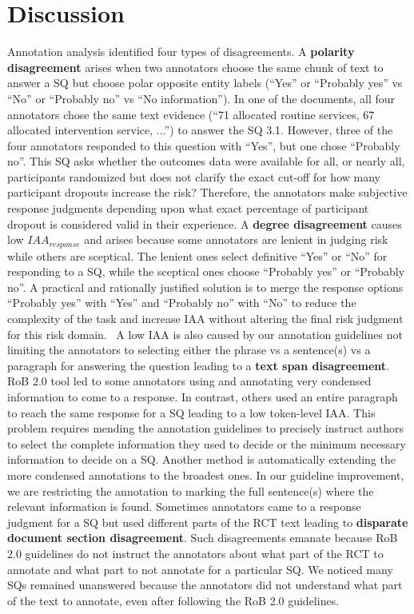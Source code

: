 \documentclass{IOS-Book-Article}
\begin{document}
\section{Discussion}
\label{sec:disc}
%
Annotation analysis identified four types of disagreements. 
A \textbf{polarity disagreement} arises when two annotators choose the same chunk of text to answer a SQ but choose polar opposite entity labels (``Yes'' or ``Probably yes'' vs ``No'' or ``Probably no'' vs ``No information'').
In one of the documents, all four annotators chose the same text evidence (``71 allocated routine services, 67 allocated intervention service, ...'') to answer the SQ 3.1.
However, three of the four annotators responded to this question with ``Yes'', but one chose ``Probably no''.
This SQ asks whether the outcomes data were available for all, or nearly all, participants randomized but does not clarify the exact cut-off for how many participant dropouts increase the risk?
Therefore, the annotators make subjective response judgments depending upon what exact percentage of participant dropout is considered valid in their experience.
A \textbf{degree disagreement} causes low $IAA_{response}$ and arises because some annotators are lenient in judging risk while others are sceptical.
The lenient ones select definitive ``Yes'' or ``No'' for responding to a SQ, while the sceptical ones choose ``Probably yes'' or ``Probably no''.
A practical and rationally justified solution is to merge the response options ``Probably yes'' with ``Yes'' and ``Probably no'' with ``No'' to reduce the complexity of the task and increase IAA without altering the final risk judgment for this risk domain.~\cite{sterne2019rob}
A low IAA is also caused by our annotation guidelines not limiting the annotators to selecting either the phrase vs a sentence(s) vs a paragraph for answering the question leading to a \textbf{text span disagreement}.
RoB 2.0 tool led to some annotators using and annotating very condensed information to come to a response.
In contrast, others used an entire paragraph to reach the same response for a SQ leading to a low token-level IAA.
This problem requires mending the annotation guidelines to precisely instruct authors to select the complete information they used to decide or the minimum necessary information to decide on a SQ.
Another method is automatically extending the more condensed annotations to the broadest ones.
In our guideline improvement, we are restricting the annotation to marking the full sentence(s) where the relevant information is found.
Sometimes annotators came to a response judgment for a SQ but used different parts of the RCT text leading to \textbf{disparate document section disagreement}.
Such disagreements emanate because RoB 2.0 guidelines do not instruct the annotators about what part of the RCT to annotate and what part to not annotate for a particular SQ.
We noticed many SQs remained unanswered because the annotators did not understand what part of the text to annotate, even after following the RoB 2.0 guidelines.
%
%
%
\end{document}
